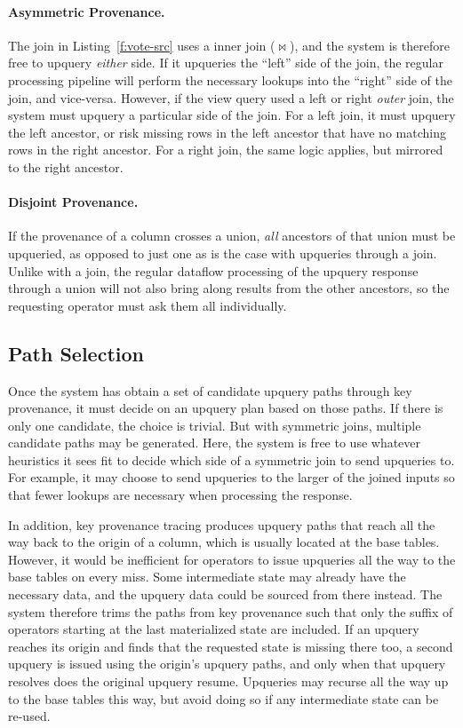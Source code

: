 \paragraph{Asymmetric Provenance.}
The join in Listing~\ref{f:vote-src} uses a inner join ($\bowtie$), and the
system is therefore free to upquery \emph{either} side. If it upqueries the
``left'' side of the join, the regular processing pipeline will perform the
necessary lookups into the ``right'' side of the join, and vice-versa. However,
if the view query used a left or right \emph{outer} join, the system must
upquery a particular side of the join. For a left join, it must upquery the left
ancestor, or risk missing rows in the left ancestor that have no matching rows
in the right ancestor. For a right join, the same logic applies, but mirrored to
the right ancestor.

\paragraph{Disjoint Provenance.}
If the provenance of a column crosses a union, \emph{all} ancestors of that
union must be upqueried, as opposed to just one as is the case with upqueries
through a join. Unlike with a join, the regular dataflow processing of the
upquery response through a union will not also bring along results from the
other ancestors, so the requesting operator must ask them all individually.

\subsection{Path Selection}
\label{s:upquery:selection}

Once the system has obtain a set of candidate upquery paths through key
provenance, it must decide on an upquery plan based on those paths. If there is
only one candidate, the choice is trivial. But with symmetric joins, multiple
candidate paths may be generated. Here, the system is free to use whatever
heuristics it sees fit to decide which side of a symmetric join to send
upqueries to. For example, it may choose to send upqueries to the larger of the
joined inputs so that fewer lookups are necessary when processing the response.

In addition, key provenance tracing produces upquery paths that reach all the
way back to the origin of a column, which is usually located at the base tables.
However, it would be inefficient for operators to issue upqueries all the way to
the base tables on every miss. Some intermediate state may already have the
necessary data, and the upquery data could be sourced from there instead. The
system therefore trims the paths from key provenance such that only the suffix
of operators starting at the last materialized state are included. If an upquery
reaches its origin and finds that the requested state is missing there too, a
second upquery is issued using the origin's upquery paths, and only when that
upquery resolves does the original upquery resume. Upqueries may recurse all the
way up to the base tables this way, but avoid doing so if any intermediate state
can be re-used.

